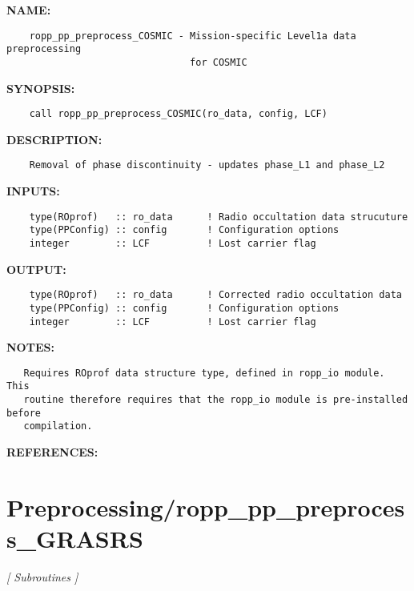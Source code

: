 \label{ch:robo81}
\label{ch:Preprocessing_ropp_pp_preprocess_COSMIC}
\textbf{NAME:}\hspace{0.08in}\begin{Verbatim}
    ropp_pp_preprocess_COSMIC - Mission-specific Level1a data preprocessing
                                for COSMIC 
\end{Verbatim}
\textbf{SYNOPSIS:}\hspace{0.08in}\begin{Verbatim}
    call ropp_pp_preprocess_COSMIC(ro_data, config, LCF)
\end{Verbatim}
\textbf{DESCRIPTION:}\hspace{0.08in}\begin{Verbatim}
    Removal of phase discontinuity - updates phase_L1 and phase_L2
\end{Verbatim}
\textbf{INPUTS:}\hspace{0.08in}\begin{Verbatim}
    type(ROprof)   :: ro_data      ! Radio occultation data strucuture
    type(PPConfig) :: config       ! Configuration options
    integer        :: LCF          ! Lost carrier flag
\end{Verbatim}
\textbf{OUTPUT:}\hspace{0.08in}\begin{Verbatim}
    type(ROprof)   :: ro_data      ! Corrected radio occultation data
    type(PPConfig) :: config       ! Configuration options
    integer        :: LCF          ! Lost carrier flag
\end{Verbatim}
\textbf{NOTES:}\hspace{0.08in}\begin{Verbatim}
   Requires ROprof data structure type, defined in ropp_io module. This 
   routine therefore requires that the ropp_io module is pre-installed before
   compilation.
\end{Verbatim}
\textbf{REFERENCES:}\hspace{0.08in}\section{Preprocessing/ropp\_pp\_preprocess\_GRASRS}
\textsl{[ Subroutines ]}

